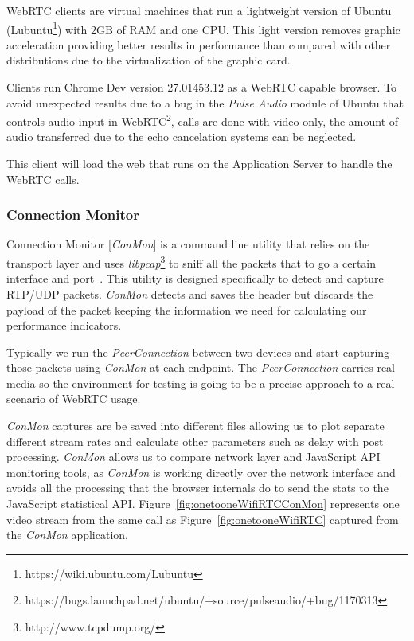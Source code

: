WebRTC clients are virtual machines that run a lightweight version of Ubuntu (Lubuntu\footnote{https://wiki.ubuntu.com/Lubuntu}) with 2GB of RAM and one CPU. This light version removes graphic acceleration providing better results in performance than compared with other distributions due to the virtualization of the graphic card. 

Clients run Chrome Dev version 27.01453.12 as a WebRTC capable browser. To avoid unexpected results due to a bug in the {\it Pulse Audio} module of Ubuntu that controls audio input in WebRTC\footnote{https://bugs.launchpad.net/ubuntu/+source/pulseaudio/+bug/1170313}, calls are done with video only, the amount of audio transferred due to the echo cancelation systems can be neglected.

This client will load the web that runs on the Application Server to handle the WebRTC calls.

\subsubsection{Connection Monitor}

Connection Monitor [{\it ConMon}] is a command line utility that relies on the transport layer and uses {\it libpcap}\footnote{http://www.tcpdump.org/} to sniff all the packets that to go a certain interface and port~\cite{singhConMon}. This utility is designed specifically to detect and capture RTP/UDP packets. {\it ConMon} detects and saves the header but discards the payload of the packet keeping the information we need for calculating our performance indicators.

Typically we run the {\it PeerConnection} between two devices and start capturing those packets using {\it ConMon} at each endpoint. The {\it PeerConnection} carries real media so the environment for testing is going to be a precise approach to a real scenario of WebRTC usage.

{\it ConMon} captures are be saved into different files allowing us to plot separate different stream rates and calculate other parameters such as delay with post processing. {\it ConMon} allows us to compare network layer and JavaScript API monitoring tools, as {\it ConMon} is working directly over the network interface and avoids all the processing that the browser internals do to send the stats to the JavaScript statistical API. Figure~\ref{fig:onetooneWifiRTCConMon} represents one video stream from the same call as Figure~\ref{fig:onetooneWifiRTC} captured from the {\it ConMon} application.

